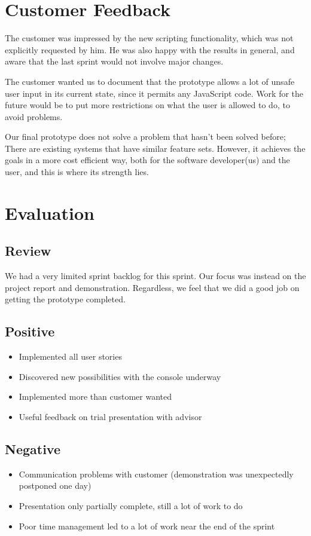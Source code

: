\section{Customer Feedback}
The customer was impressed by the new scripting functionality, which was not explicitly requested by him. He was also happy with the results in general, and aware that the last sprint would not involve major changes.

The customer wanted us to document that the prototype allows a lot of unsafe user input in its current state, since it permits any JavaScript code. Work for the future would be to put more restrictions on what the user is allowed to do, to avoid problems.

Our final prototype does not solve a problem that hasn't been solved before; There are existing systems that have similar feature sets. However, it achieves the goals in a more cost efficient way, both for the software developer(us) and the user, and this is where its strength lies.

\section{Evaluation}
\subsection{Review}
We had a very limited sprint backlog for this sprint. Our focus was instead on the project report and demonstration. Regardless, we feel that we did a good job on getting the prototype completed. 
\subsection{Positive}
\begin{itemize}
 \item Implemented all user stories
 \item Discovered new possibilities with the console underway
 \item Implemented more than customer wanted
 \item Useful feedback on trial presentation with advisor
\end{itemize}
\subsection{Negative}
\begin{itemize}
 \item Communication problems with customer (demonstration was unexpectedly postponed one day)
 \item Presentation only partially complete, still a lot of work to do
 \item Poor time management led to a lot of work near the end of the sprint
\end{itemize}